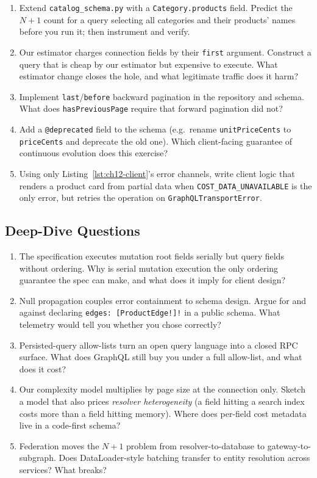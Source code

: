\begin{enumerate}[resume]
  \item Extend \texttt{catalog\_schema.py} with a
        \texttt{Category.products} field. Predict the $N{+}1$ count for a
        query selecting all categories and their products' names before
        you run it; then instrument and verify.
  \item Our estimator charges connection fields by their \texttt{first}
        argument. Construct a query that is cheap by our estimator but
        expensive to execute. What estimator change closes the hole, and
        what legitimate traffic does it harm?
  \item Implement \texttt{last}/\texttt{before} backward pagination in
        the repository and schema. What does \texttt{hasPreviousPage}
        require that forward pagination did not?
  \item Add a \texttt{@deprecated} field to the schema (e.g.\ rename
        \texttt{unitPriceCents} to \texttt{priceCents} and deprecate the
        old one). Which client-facing guarantee of continuous evolution
        does this exercise?
  \item Using only Listing~\ref{lst:ch12-client}'s error channels, write
        client logic that renders a product card from partial data when
        \texttt{COST\_DATA\_UNAVAILABLE} is the only error, but retries
        the operation on \texttt{GraphQLTransportError}.
\end{enumerate}

\subsection{Deep-Dive Questions}

\begin{enumerate}[resume]
  \item The specification executes mutation root fields serially but query
        fields without ordering. Why is serial mutation execution the only
        ordering guarantee the spec can make, and what does it imply for
        client design?
  \item Null propagation couples error containment to schema design.
        Argue for and against declaring \texttt{edges: [ProductEdge!]!} in
        a public schema. What telemetry would tell you whether you chose
        correctly?
  \item Persisted-query allow-lists turn an open query language into a
        closed RPC surface. What does GraphQL still buy you under a full
        allow-list, and what does it cost?
  \item Our complexity model multiplies by page size at the connection
        only. Sketch a model that also prices \emph{resolver heterogeneity}
        (a field hitting a search index costs more than a field hitting
        memory). Where does per-field cost metadata live in a code-first
        schema?
  \item Federation moves the $N{+}1$ problem from resolver-to-database to
        gateway-to-subgraph. Does DataLoader-style batching transfer to
        entity resolution across services? What breaks?
\end{enumerate}

